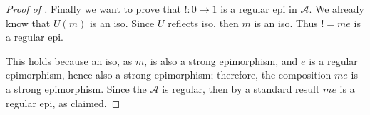 \begin{subbox}{}
\begin{proof}[\textit{Proof of }]
    Finally we want to prove that $!:0 \to 1$ is a regular epi in $\mathcal{A}$. We already know that $U(m)$ is an iso. Since $U$ reflects iso, then $m$ is an iso. Thus $! = me$ is a regular epi.
    
    This holds because an iso, as $m$, is also a strong epimorphism, and $e$ is a regular epimorphism, hence also a strong epimorphism; therefore, the composition $me$ is a strong epimorphism. Since the $\mathcal{A}$ is regular, then by a standard result $me$ is a regular epi, as claimed.
    
\end{proof}
\end{subbox}
